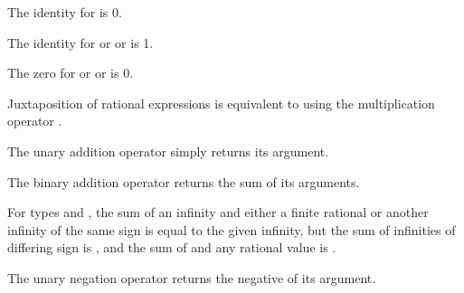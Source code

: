 
The identity for \EXP{+} is 0.

The identity for  or \EXP{\cdot} or \EXP{\times} is 1.

The zero for  or \EXP{\cdot} or \EXP{\times} is 0.




Juxtaposition of rational expressions is equivalent to using the multiplication operator \EXP{\cdot}.



The unary addition operator \EXP{+} simply returns its argument.



The binary addition operator \EXP{+} returns the sum of its arguments.

For types  and , the sum of an infinity
and either a finite rational or another infinity of the same sign is equal to the given infinity,
but the sum of infinities of differing sign is ,
and the sum of  and any rational value is .



The unary negation operator \EXP{-} returns the negative of its argument.

